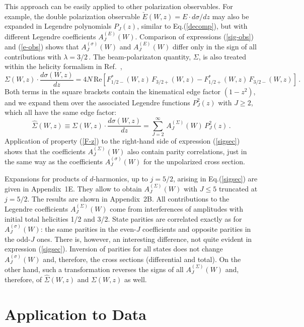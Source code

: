 \documentclass[prc,reprint,onecolumn,amsmath,amssymb,superscriptaddress]{revtex4-1}
\newcommand{\be}{\begin{equation}}
\newcommand{\ee}{\end{equation}}
\begin{document}
This approach can be easily applied to other polarization
observables. For example,
the double polarization observable $\check{E}(W,z)=E\cdot d\sigma/dz$ may also 
be expanded in Legendre polynomials $P_J(z)$, similar to Eq.(\ref{decomp}), 
but with different Legendre coefficients $A^{(E)}_J(W)$. Comparison of 
expressions (\ref{sig-obs}) and (\ref{e-obs}) shows that $A^{(\sigma)}_J(W)$ 
and $A^{(E)}_J(W)$ differ only in the sign of all contributions with 
$\lambda=3/2\,$.
The beam-polarizaton quantity, $\Sigma$, is also treated within the helicity
formalism in Ref.~\cite{Walker}, 
\be
	\Sigma(W,z)\cdot\frac{d\sigma(W,z)}{dz}=
	4N\,\textrm{Re}\left[F_{1/2-}^\ast(W,z)\,F_{3/2+}(W,z)-
	F_{1/2+}^\ast(W,z)\,F_{3/2-}(W,z)\right]\,.
	\label{sigsec}
\ee
Both terms in the square brackets contain the kinematical edge factor 
$(1-z^2)$, and we expand them over the associated Legendre functions $P^2_J(z)$ 
with $J\geq2$, which all have the same edge factor:
\be
	\hat{\Sigma}(W,z)\equiv\Sigma(W,z)\cdot\frac{d\sigma(W,z)}{dz}=
	\sum_{J=2}^{\infty}\,A^{(\Sigma)}_J(W)\,P^2_J(z)\,.
	\label{sigsecJ}
\ee
Application of property (\ref{F-z}) to the right-hand side of expression 
(\ref{sigsec}) shows that the coefficients $A^{(\Sigma)}_J(W)$ also contain 
parity correlations, just in the same way as the coefficients 
$A^{(\sigma)}_J(W)$ for the unpolarized cross section.

Expansions for products of $d$-harmonics, up to $j=5/2$, arising in 
Eq.(\ref{sigsec}) are given in Appendix~1E. They allow to obtain 
$A^{(\Sigma)}_J(W)$ with $J\leq5$ truncated at $j=5/2$.  The results are 
shown in Appendix~2B. All contributions to the Legendre coefficients 
$A^{(\Sigma)}_J(W)$ come from interferences of amplitudes with initial 
total helicities 1/2 and 3/2. State parities are correlated exactly as 
for $A^{(\sigma)}_J(W)$: the same parities in the even-$J$ coefficients 
and opposite parities in the odd-$J$ ones. There is, however, an 
interesting difference, not quite evident in expression (\ref{sigsec}). 
Inversion of parities for all states does not change $A^{(\sigma)}_J(W)$ 
and, therefore, the cross sections (differential and total). On the other 
hand, such a transformation reverses the signs of all $A^{(\Sigma)}_J(W)$ and, 
therefore, of $\hat{\Sigma}(W,z)$ and $\Sigma(W,z)$ as well.

\section{Application to Data}
\label{sec:app}
\end{document}
